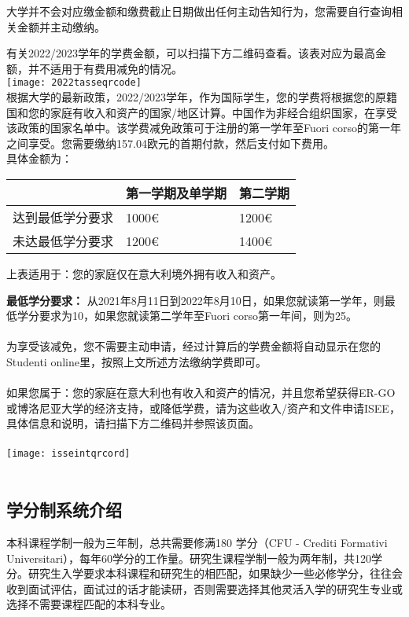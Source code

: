 大学并不会对应缴金额和缴费截止日期做出任何主动告知行为，您需要自行查询相关金额并主动缴纳。

有关2022/2023学年的学费金额，可以扫描下方二维码查看。该表对应为最高金额，并不适用于有费用减免的情况。\\

\texttt{[image: 2022tasseqrcode]}\\


根据大学的最新政策，2022/2023学年，作为国际学生，您的学费将根据您的原籍国和您的家庭有收入和资产的国家/地区计算。中国作为非经合组织国家，在享受该政策的国家名单中。该学费减免政策可于注册的第一学年至Fuori corso的第一年之间享受。您需要缴纳157.04欧元的首期付款，然后支付如下费用。\\
具体金额为：\\
\begin{tabularx}{\textwidth}{ |X|X|X| }
  \hline
   & 第一学期及单学期 & 第二学期\\
  \hline 
  达到最低学分要求  & 1000€ & 1200€  \\
  \hline 
  未达最低学分要求  & 1200€ & 1400€  \\
  \hline
\end{tabularx}


上表适用于：您的家庭仅在意大利境外拥有收入和资产。


\textbf{最低学分要求：}
从2021年8月11日到2022年8月10日，如果您就读第一学年，则最低学分要求为10，如果您就读第二学年至Fuori corso第一年间，则为25。\\
\\
为享受该减免，您不需要主动申请，经过计算后的学费金额将自动显示在您的Studenti online里，按照上文所述方法缴纳学费即可。\\
\\
如果您属于：您的家庭在意大利也有收入和资产的情况，并且您希望获得ER-GO或博洛尼亚大学的经济支持，或降低学费，请为这些收入/资产和文件申请ISEE，具体信息和说明，请扫描下方二维码并参照该页面。\\
\\
\texttt{[image: isseintqrcord]}\\
\\

\subsection{学分制系统介绍}
本科课程学制一般为三年制，总共需要修满180 学分（CFU - Crediti Formativi Universitari），每年60学分的工作量。研究生课程学制一般为两年制，共120学分。研究生入学要求本科课程和研究生的相匹配，如果缺少一些必修学分，往往会收到面试评估，面试过的话才能读研，否则需要选择其他灵活入学的研究生专业或选择不需要课程匹配的本科专业。 

